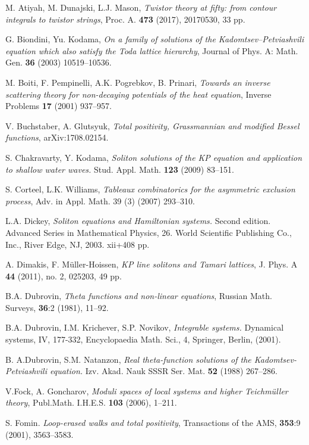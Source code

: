 \documentclass[11pt]{amsart}
\theoremstyle{plain}
\numberwithin{equation}{section}
\begin{document}
\begin{thebibliography}{111}
 M. Atiyah, M. Dunajski, L.J. Mason, {\em Twistor theory at fifty: from contour integrals to twistor strings}, Proc. A. {\bf 473} (2017),  20170530, 33 pp. 

 G. Biondini, Yu. Kodama, {\em On a family of solutions of the Kadomtsev–Petviashvili equation which also satisfy the Toda
lattice hierarchy}, Journal of Phys. A: Math. Gen. \textbf{36} (2003) 10519--10536.

 M. Boiti, F. Pempinelli, A.K. Pogrebkov, B. Prinari, {\em Towards an inverse scattering theory for non-decaying potentials of the heat equation}, Inverse Problems {\bf 17} (2001) 937--957.

 V. Buchstaber, A. Glutsyuk, {\em Total positivity, Grassmannian and modified Bessel functions}, 
arXiv:1708.02154.

 S. Chakravarty, Y. Kodama, {\em Soliton solutions of the KP equation and application to shallow water waves.} Stud. Appl. Math. {\bf 123} (2009) 83--151.

 S. Corteel, L.K. Williams, {\em Tableaux combinatorics for the asymmetric exclusion process}, Adv. in
Appl. Math. 39 (3) (2007) 293--310.

 L.A. Dickey,  {\em Soliton equations and Hamiltonian systems.} Second edition. Advanced Series in Mathematical Physics, 26. World Scientific Publishing Co., Inc., River Edge, NJ, 2003. xii+408 pp.

 A. Dimakis, F. M\"uller-Hoissen, {\em KP line solitons and Tamari lattices}, J. Phys. A {\bf 44} (2011), no. 2, 025203, 49 pp.

 B.A. Dubrovin, {\em Theta functions and non-linear equations}, Russian Math. Surveys, {\bf 36}:2 (1981), 11--92.

 B.A. Dubrovin, I.M. Krichever, S.P. Novikov, {\em Integrable systems.}  Dynamical systems, IV, 177-332, Encyclopaedia Math. Sci., 4, Springer, Berlin, (2001).

 B. A.Dubrovin, S.M. Natanzon, {\em Real theta-function solutions of the Kadomtsev-Petviashvili equation.} Izv. Akad. Nauk SSSR Ser. Mat. {\bf 52} (1988) 267--286.

 V.Fock, A. Goncharov, {\em Moduli spaces of local systems and higher Teichm\"uller theory}, Publ.Math. I.H.E.S. {\bf 103} (2006), 1--211.

  S. Fomin. {\em Loop-erased walks and total positivity}, Transactions of the AMS, {\bf 353}:9 (2001), 3563--3583.


\end{thebibliography}
\end{document}
